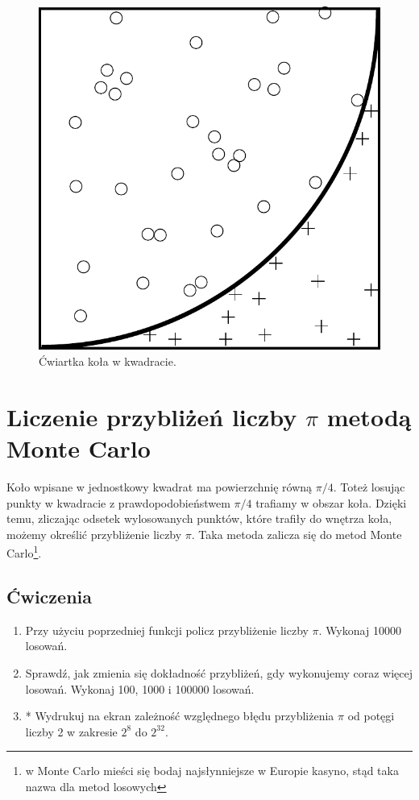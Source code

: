 \documentclass{instrukcja}
\begin{document}
\begin{figure}[htb]
\centering
\includegraphics[scale=0.4]{monte_carlo.pdf}
\caption{Ćwiartka koła w kwadracie.}
\label{fig:awesome_image}
\end{figure}

\section*{Liczenie przybliżeń liczby \(\pi\) metodą Monte Carlo}
Koło wpisane w jednostkowy kwadrat ma powierzchnię równą  \(\pi/4\). Toteż losując punkty w kwadracie z prawdopodobieństwem  \(\pi/4\) trafiamy w obszar koła. 
Dzięki temu, zliczając odsetek wylosowanych punktów, które trafiły do wnętrza koła, możemy określić przybliżenie liczby   \(\pi\). Taka metoda zalicza się do metod Monte Carlo\footnote{w Monte Carlo mieści się bodaj najsłynniejsze w Europie kasyno, stąd taka nazwa dla metod losowych}. 

\subsection*{Ćwiczenia}
\begin{enumerate}
\item Przy użyciu poprzedniej funkcji policz przybliżenie liczby \(\pi\). Wykonaj 10000 losowań.
\item Sprawdź, jak zmienia się dokładność przybliżeń, gdy wykonujemy coraz więcej losowań. Wykonaj 100, 1000 i 100000  losowań. 
\item* Wydrukuj na ekran zależność względnego błędu przybliżenia \(\pi\) od potęgi liczby 2 w zakresie  \(2^{8}\) do \(2^{32}\).




\end{enumerate}
\end{document}
